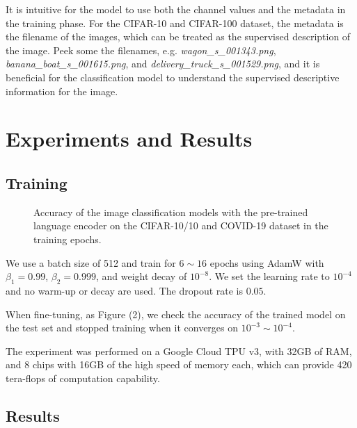 \documentclass[runningheads]{llncs}
\begin{document}
\par It is intuitive for the model to use both the channel values and the metadata in the training phase.
For the CIFAR-10 and CIFAR-100 dataset, the metadata is the filename of the images, which can be treated as the supervised description of the image.
Peek some the filenames, e.g. \textit{wagon\_s\_001343.png}, \textit{banana\_boat\_s\_001615.png}, and \textit{delivery\_truck\_s\_001529.png},
and it is beneficial for the classification model to understand the supervised descriptive information for the image.



\section{Experiments and Results}


\subsection{Training}

\begin{figure*}
\begin{center}
\end{center}
   \caption{Accuracy of the image classification models with the pre-trained language encoder on the CIFAR-10/10 and COVID-19 dataset in the training epochs.}
\label{fig:short}
\end{figure*}



We use a batch size of 512 and train for $6\sim16$ epochs using AdamW with $\beta_1=0.99$, $\beta_2=0.999$, and weight decay of $10^{-8}$.
We set the learning rate to $10^{-4}$ and no warm-up or decay are used.
The dropout rate is $0.05$.

\par When fine-tuning, as Figure (2), we check the accuracy of the trained model on the test set and stopped training when it converges on $10^{-3}\sim10^{-4}$.

\par The experiment was performed on a Google Cloud TPU v3, with 32GB of RAM, and 8 chips with 16GB of the high speed of memory each,
which can provide 420 tera-flops of computation capability.

\subsection{Results}
\end{document}
